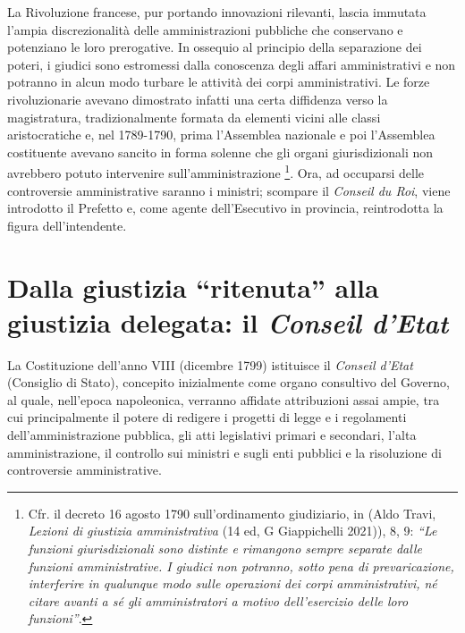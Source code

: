 \documentclass[12pt,it,a4paper,]{report}
\begin{document}
La Rivoluzione francese, pur portando innovazioni rilevanti, lascia
immutata l'ampia discrezionalità delle amministrazioni pubbliche che
conservano e potenziano le loro prerogative. In ossequio al principio
della separazione dei poteri, i giudici sono estromessi dalla conoscenza
degli affari amministrativi e non potranno in alcun modo turbare le
attività dei corpi amministrativi. Le forze rivoluzionarie avevano
dimostrato infatti una certa diffidenza verso la magistratura,
tradizionalmente formata da elementi vicini alle classi aristocratiche
e, nel 1789-1790, prima l'Assemblea nazionale e poi l'Assemblea
costituente avevano sancito in forma solenne che gli organi
giurisdizionali non avrebbero potuto intervenire sull'amministrazione
\footnote{Cfr. il decreto 16 agosto 1790 sull'ordinamento giudiziario,
  in (Aldo Travi, \emph{Lezioni di giustizia amministrativa} (14 ed, G
  Giappichelli 2021)), 8, 9: \emph{``Le funzioni giurisdizionali sono
  distinte e rimangono sempre separate dalle funzioni amministrative. I
  giudici non potranno, sotto pena di prevaricazione, interferire in
  qualunque modo sulle operazioni dei corpi amministrativi, né citare
  avanti a sé gli amministratori a motivo dell'esercizio delle loro
  funzioni''}.}. Ora, ad occuparsi delle controversie amministrative
saranno i ministri; scompare il \emph{Conseil du Roi}, viene introdotto
il Prefetto e, come agente dell'Esecutivo in provincia, reintrodotta la
figura dell'intendente.

\hypertarget{dalla-giustizia-ritenuta-alla-giustizia-delegata-il-conseil-detat}{%
\section{\texorpdfstring{Dalla giustizia ``ritenuta'' alla giustizia
delegata: il \emph{Conseil
d'Etat}}{Dalla giustizia ``ritenuta'' alla giustizia delegata: il Conseil d'Etat}}\label{dalla-giustizia-ritenuta-alla-giustizia-delegata-il-conseil-detat}}

La Costituzione dell'anno VIII (dicembre 1799) istituisce il
\emph{Conseil d'Etat} (Consiglio di Stato), concepito inizialmente come
organo consultivo del Governo, al quale, nell'epoca napoleonica,
verranno affidate attribuzioni assai ampie, tra cui principalmente il
potere di redigere i progetti di legge e i regolamenti
dell'amministrazione pubblica, gli atti legislativi primari e secondari,
l'alta amministrazione, il controllo sui ministri e sugli enti pubblici
e la risoluzione di controversie amministrative.
\end{document}
